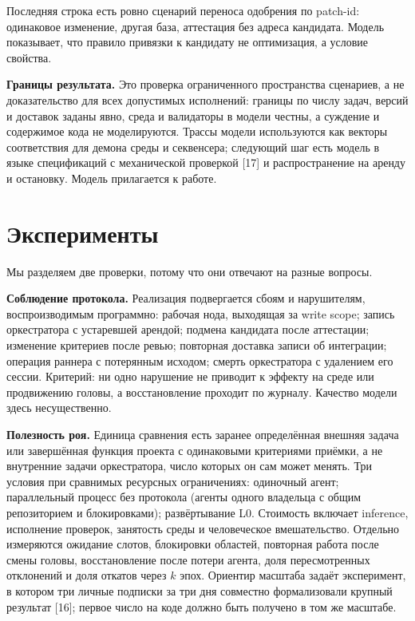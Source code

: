 \documentclass[11pt,a4paper]{article}
\begin{document}
Последняя строка есть ровно сценарий переноса одобрения по patch-id: одинаковое изменение, другая база, аттестация без адреса кандидата. Модель показывает, что правило привязки к кандидату не оптимизация, а условие свойства.

\textbf{Границы результата.} Это проверка ограниченного пространства сценариев, а не доказательство для всех допустимых исполнений: границы по числу задач, версий и доставок заданы явно, среда и валидаторы в модели честны, а суждение и содержимое кода не моделируются. Трассы модели используются как векторы соответствия для демона среды и секвенсера; следующий шаг есть модель в языке спецификаций с механической проверкой [17] и распространение на аренду и остановку. Модель прилагается к работе.

\section{Эксперименты}

Мы разделяем две проверки, потому что они отвечают на разные вопросы.

\textbf{Соблюдение протокола.} Реализация подвергается сбоям и нарушителям, воспроизводимым программно: рабочая нода, выходящая за write scope; запись оркестратора с устаревшей арендой; подмена кандидата после аттестации; изменение критериев после ревью; повторная доставка записи об интеграции; операция раннера с потерянным исходом; смерть оркестратора с удалением его сессии. Критерий: ни одно нарушение не приводит к эффекту на среде или продвижению головы, а восстановление проходит по журналу. Качество модели здесь несущественно.

\textbf{Полезность роя.} Единица сравнения есть заранее определённая внешняя задача или завершённая функция проекта с одинаковыми критериями приёмки, а не внутренние задачи оркестратора, число которых он сам может менять. Три условия при сравнимых ресурсных ограничениях: одиночный агент; параллельный процесс без протокола (агенты одного владельца с общим репозиторием и блокировками); развёртывание L0. Стоимость включает inference, исполнение проверок, занятость среды и человеческое вмешательство. Отдельно измеряются ожидание слотов, блокировки областей, повторная работа после смены головы, восстановление после потери агента, доля пересмотренных отклонений и доля откатов через $k$ эпох. Ориентир масштаба задаёт эксперимент, в котором три личные подписки за три дня совместно формализовали крупный результат [16]; первое число на коде должно быть получено в том же масштабе.
\end{document}

